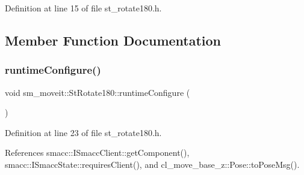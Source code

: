 Definition at line 15 of file st\+\_\+rotate180.\+h.



\subsection{Member Function Documentation}
\mbox{\label{structsm__moveit_1_1StRotate180_af424dc219c107d5c3678c6fc915d9c68}} 
\subsubsection{\texorpdfstring{runtime\+Configure()}{runtimeConfigure()}}
{\footnotesize\ttfamily void sm\+\_\+moveit\+::\+St\+Rotate180\+::runtime\+Configure (\begin{DoxyParamCaption}{ }\end{DoxyParamCaption})\hspace{0.3cm}{\ttfamily [inline]}}



Definition at line 23 of file st\+\_\+rotate180.\+h.



References smacc\+::\+I\+Smacc\+Client\+::get\+Component(), smacc\+::\+I\+Smacc\+State\+::requires\+Client(), and cl\+\_\+move\+\_\+base\+\_\+z\+::\+Pose\+::to\+Pose\+Msg().


